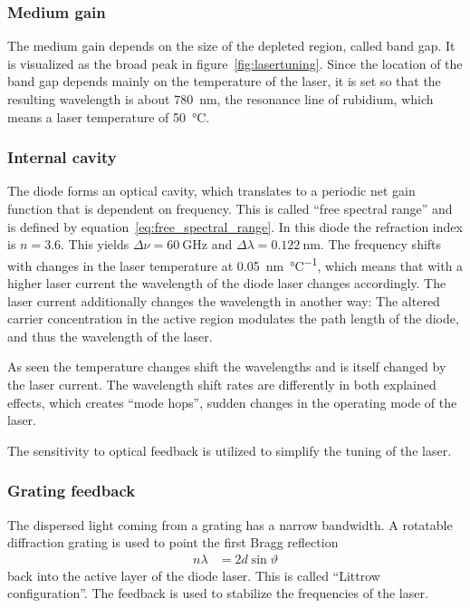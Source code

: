 \subsubsection{Medium gain}\label{medium-gain}
The medium gain depends on the size of the depleted region, called band gap.
It is visualized as the broad peak in figure~\ref{fig:lasertuning}.
Since the location of the band gap depends mainly on the temperature of the laser,
it is set so that the resulting wavelength is about \SI{780}{\nano\meter},
the resonance line of rubidium,
which means a laser temperature of \SI{50}{\celsius}.

\subsubsection{Internal cavity}\label{internal-cavity}
The diode forms an optical cavity, which translates to a periodic net gain function
that is dependent on frequency.
This is called \enquote{free spectral range} and is defined by
equation~\eqref{eq:free_spectral_range}.
In this diode the refraction index is $n = \num{3.6}$\cite{anleitung}.
This yields $\Delta \nu = \SI{60}{\giga\hertz}$ and $\Delta \lambda = \SI{0.122}{\nano\meter}$.
The frequency shifts with changes in the laser temperature at \SI{0.05}{\nano\meter\per\celsius},
which means that with a higher laser current the wavelength of the diode laser changes accordingly.
The laser current additionally changes the wavelength in another way:
The altered carrier concentration in the active region modulates the path length of the diode,
and thus the wavelength of the laser.

As seen the temperature changes shift the wavelengths and is itself changed by the laser current.
The wavelength shift rates are differently in both explained effects, which creates \enquote{mode
hops}, sudden changes in the operating mode of the laser.

The sensitivity to optical feedback is utilized to simplify the tuning of the laser.

\subsubsection{Grating feedback}\label{grating-feedback}
The dispersed light coming from a grating has a narrow bandwidth.
A rotatable diffraction grating is used to point the first Bragg reflection
\begin{align}
  n \lambda &= 2 d \sin\!{\vartheta}
\end{align}
back into the active layer of the diode laser.
This is called \enquote{Littrow configuration}.
The feedback is used to stabilize the frequencies of the laser.

